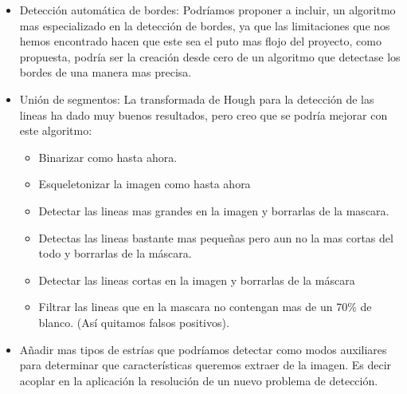 \begin{itemize}
	\item Detección automática de bordes: 
Podríamos proponer a incluir, un algoritmo mas especializado en la detección de bordes, ya que las limitaciones que nos hemos encontrado hacen que este sea el puto mas flojo del proyecto, como propuesta, podría ser la creación desde cero de un algoritmo que detectase los bordes de una manera mas precisa.

	\item Unión de segmentos: 
La transformada de Hough para la detección de las lineas ha dado muy buenos resultados, pero creo que se podría mejorar con este algoritmo: 

	\begin{itemize}
		\item Binarizar como hasta ahora.
		\item Esqueletonizar la imagen como hasta ahora
		\item Detectar las lineas mas grandes en la imagen y borrarlas de la mascara.
		\item Detectas las lineas bastante mas pequeñas pero aun no la mas cortas del todo y borrarlas de la máscara.
		\item Detectar las lineas cortas en la imagen y borrarlas de la máscara
		\item Filtrar las lineas que en la mascara no contengan mas de un 70\% de blanco. (Así quitamos falsos positivos).
	\end{itemize}
	\item Añadir mas tipos de estrías que podríamos detectar como modos auxiliares para determinar que características queremos extraer de la imagen. Es decir acoplar en la aplicación la resolución de un nuevo problema de detección.
	
\end{itemize}